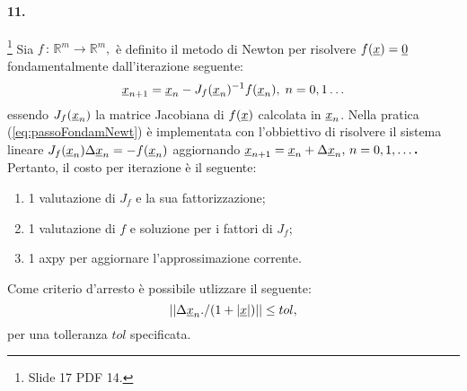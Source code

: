 \paragraph{11.}\footnote{Slide 17 PDF 14.} Sia $f\,:\,\mathbb R^m\rightarrow\mathbb R^m,$ è definito il metodo di Newton per risolvere $f(\uline x)=\uline 0$ fondamentalmente dall'iterazione seguente:
\begin{equation}\label{eq:passoFondamNewt}
    \uline x_{n+1}=\uline x_n - J_f(\uline x_n)^{-1}f(\uline x_n),\; n=0,1\hdots
\end{equation}
essendo $J_f(\uline x_n)$ la matrice Jacobiana di $f(\uline x)$ calcolata in $\uline x_n$. Nella pratica (\ref{eq:passoFondamNewt}) è implementata con l'obbiettivo di risolvere il sistema lineare $J_f(\uline x_n)\Delta \uline x_n=-f(\uline x_n)$ aggiornando $\uline x_{n+1}=\uline x_n+\Delta\uline x_n,\, n=0,1,\hdots\boldsymbol .$ Pertanto, il costo per iterazione è il seguente:
\begin{enumerate}
    \item 1 valutazione di $J_f$ e la sua fattorizzazione;
    \item 1 valutazione di $f$ e soluzione per i fattori di $J_f$;
    \item 1 axpy per aggiornare l'approssimazione corrente.
\end{enumerate}
Come criterio d'arresto è possibile utlizzare il seguente:
\begin{equation*}
    ||\Delta\uline x_n./(1+|\uline x|)||\leq tol, 
\end{equation*}
per una tolleranza $tol$ specificata.

